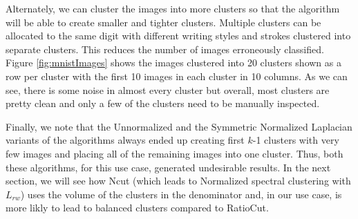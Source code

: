 \documentclass[10pt,a4paper, nocenter]{report}
\begin{document}
\begin{enumerate}
        Alternately, we can cluster the images into more clusters so that the algorithm will be able to create smaller and tighter clusters. Multiple clusters can be allocated  to the same digit with different writing styles and strokes clustered into separate clusters. This reduces the number of images erroneously classified. Figure \ref{fig:mnistImages} shows the images clustered into 20 clusters shown as a row per cluster with the first 10 images in each cluster in 10 columns. As we can see, there is some noise in almost every cluster but overall, most clusters are pretty clean and only a few of the clusters need to be manually inspected. 

        Finally, we note that the Unnormalized and the Symmetric Normalized Laplacian variants of the algorithms always ended up creating first $k$-1 clusters with very few images and placing all of the remaining images into one cluster. Thus, both these algorithms, for this use case, generated undesirable results. In the next section, we will see how Ncut (which leads to Normalized spectral clustering with $L_{rw}$) uses the volume of the clusters in the denominator and, in our use case, is more likly to lead to balanced clusters compared to RatioCut.


\end{enumerate}
\end{document}
